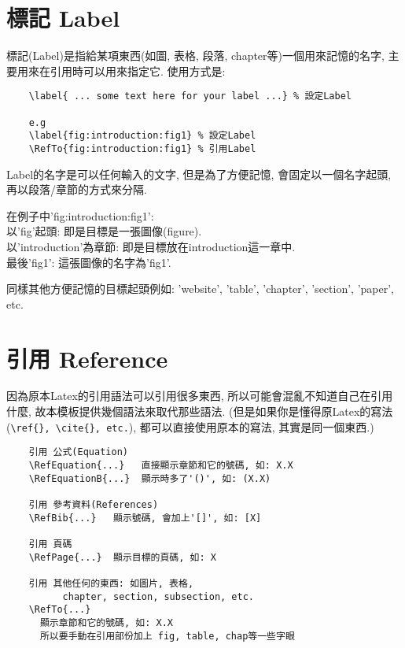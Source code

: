 \newpage
\section{標記 Label}
標記(Label)是指給某項東西(如圖, 表格, 段落, chapter等)一個用來記憶的名字, 主要用來在引用時可以用來指定它. 使用方式是:

  \begin{framed}
  \begin{verbatim}
    \label{ ... some text here for your label ...} % 設定Label

    e.g
    \label{fig:introduction:fig1} % 設定Label
    \RefTo{fig:introduction:fig1} % 引用Label
  \end{verbatim}
  \end{framed}

Label的名字是可以任何輸入的文字, 但是為了方便記憶, 會固定以一個名字起頭, 再以段落/章節的方式來分隔.

\noindent 在例子中'fig:introduction:fig1':\\
以'fig'起頭: 即是目標是一張圖像(figure).\\
以'introduction'為章節: 即是目標放在introduction這一章中.\\
最後'fig1': 這張圖像的名字為'fig1'.

同樣其他方便記憶的目標起頭例如: 'website', 'table', 'chapter', 'section', 'paper', etc.

\newpage
\section{引用 Reference}
因為原本Latex的引用語法可以引用很多東西, 所以可能會混亂不知道自己在引用什麼, 故本模板提供幾個語法來取代那些語法. (但是如果你是懂得原Latex的寫法(\verb|\ref{}, \cite{}, etc.|), 都可以直接使用原本的寫法, 其實是同一個東西.)

  \begin{framed}
  \begin{verbatim}
    引用 公式(Equation)
    \RefEquation{...}   直接顯示章節和它的號碼, 如: X.X
    \RefEquationB{...}  顯示時多了'()', 如: (X.X)

    引用 參考資料(References)
    \RefBib{...}   顯示號碼, 會加上'[]', 如: [X]

    引用 頁碼
    \RefPage{...}  顯示目標的頁碼, 如: X

    引用 其他任何的東西: 如圖片, 表格,
          chapter, section, subsection, etc.
    \RefTo{...}
      顯示章節和它的號碼, 如: X.X
      所以要手動在引用部份加上 fig, table, chap等一些字眼
  \end{verbatim}
  \end{framed}

